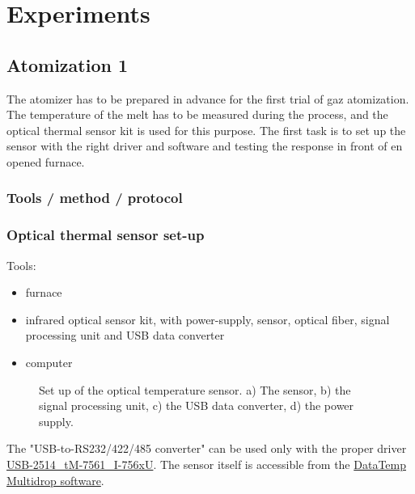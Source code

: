 \chapter{Experiments}

\section{Atomization 1}

The atomizer has to be prepared in advance for the first trial of gaz atomization. The temperature of the melt has to be measured during the process, and the optical thermal sensor kit is used for this purpose. The first task is to set up the sensor with the right driver and software and testing the response in front of en opened furnace.

\subsection{Tools / method / protocol}

\subsection{Optical thermal sensor set-up}

Tools:
\begin{itemize}
    \item furnace
    \item infrared optical sensor kit, with power-supply, sensor, optical fiber, signal processing unit and USB data converter
    \item computer
\end{itemize}

\vspace{0mm}
\begin{figure}[H]
    \centering
        
        \caption{Set up of the optical temperature sensor. a) The sensor, b) the signal processing unit, c) the USB data converter, d) the power supply.}
        \label{temperature_sensor_set-up}
\end{figure}
\vspace{0mm}

The "USB-to-RS232/422/485 converter" can be used only with the proper driver \href{https://www.icpdas.com/en/download/show.php?num=3079&model=tM-7561}{USB-2514\_tM-7561\_I-756xU}. The sensor itself is accessible from the \href{https://www.flukeprocessinstruments.com/en-us/download/datatemp-multidrop-v6199}{DataTemp Multidrop software}.


